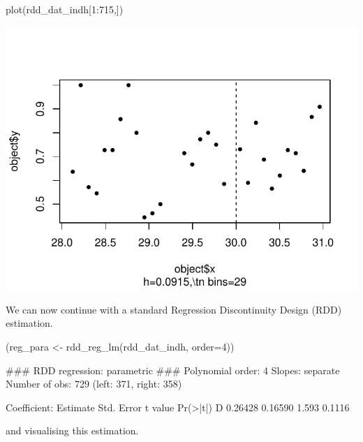 \documentclass[article]{jss}
\begin{document}
\begin{CodeChunk}
\begin{CodeInput}
plot(rdd_dat_indh[1:715,])
\end{CodeInput}


\begin{center}\includegraphics{README_files/figure-latex/unnamed-chunk-7-1} \end{center}

\end{CodeChunk}

We can now continue with a standard Regression Discontinuity Design
(RDD) estimation.

\begin{CodeChunk}
\begin{CodeInput}
(reg_para <- rdd_reg_lm(rdd_dat_indh, order=4))
\end{CodeInput}
\begin{CodeOutput}
### RDD regression: parametric ###
    Polynomial order:  4 
    Slopes:  separate 
    Number of obs: 729 (left: 371, right: 358)

    Coefficient:
  Estimate Std. Error t value Pr(>|t|)
D  0.26428    0.16590   1.593   0.1116
\end{CodeOutput}
\end{CodeChunk}

and visualising this estimation.
\end{document}
